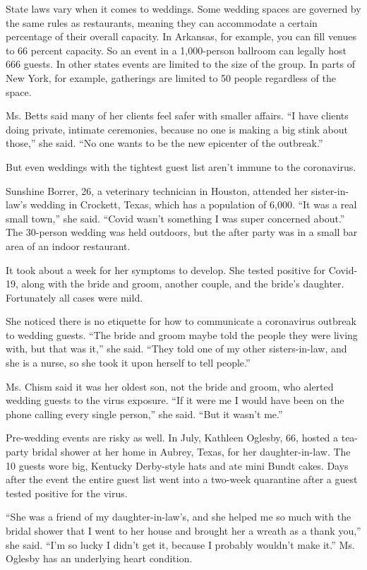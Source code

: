 State laws vary when it comes to weddings. Some wedding spaces are
governed by the same rules as restaurants, meaning they can accommodate
a certain percentage of their overall capacity. In Arkansas, for
example, you can fill venues to 66 percent capacity. So an event in a
1,000-person ballroom can legally host 666 guests. In other states
events are limited to the size of the group. In parts of New York, for
example, gatherings are limited to 50 people regardless of the space.

Ms. Betts said many of her clients feel safer with smaller affairs. ``I
have clients doing private, intimate ceremonies, because no one is
making a big stink about those,'' she said. ``No one wants to be the new
epicenter of the outbreak.''

But even weddings with the tightest guest list aren't immune to the
coronavirus.

Sunshine Borrer, 26, a veterinary technician in Houston, attended her
sister-in-law's wedding in Crockett, Texas, which has a population of
6,000. ``It was a real small town,'' she said. ``Covid wasn't something
I was super concerned about.'' The 30-person wedding was held outdoors,
but the after party was in a small bar area of an indoor restaurant.

It took about a week for her symptoms to develop. She tested positive
for Covid-19, along with the bride and groom, another couple, and the
bride's daughter. Fortunately all cases were mild.

She noticed there is no etiquette for how to communicate a coronavirus
outbreak to wedding guests. ``The bride and groom maybe told the people
they were living with, but that was it,'' she said. ``They told one of
my other sisters-in-law, and she is a nurse, so she took it upon herself
to tell people.''

Ms. Chism said it was her oldest son, not the bride and groom, who
alerted wedding guests to the virus exposure. ``If it were me I would
have been on the phone calling every single person,'' she said. ``But it
wasn't me.''

Pre-wedding events are risky as well. In July, Kathleen Oglesby, 66,
hosted a tea-party bridal shower at her home in Aubrey, Texas, for her
daughter-in-law. The 10 guests wore big, Kentucky Derby-style hats and
ate mini Bundt cakes. Days after the event the entire guest list went
into a two-week quarantine after a guest tested positive for the virus.

``She was a friend of my daughter-in-law's, and she helped me so much
with the bridal shower that I went to her house and brought her a wreath
as a thank you,'' she said. ``I'm so lucky I didn't get it, because I
probably wouldn't make it.'' Ms. Oglesby has an underlying heart
condition.

